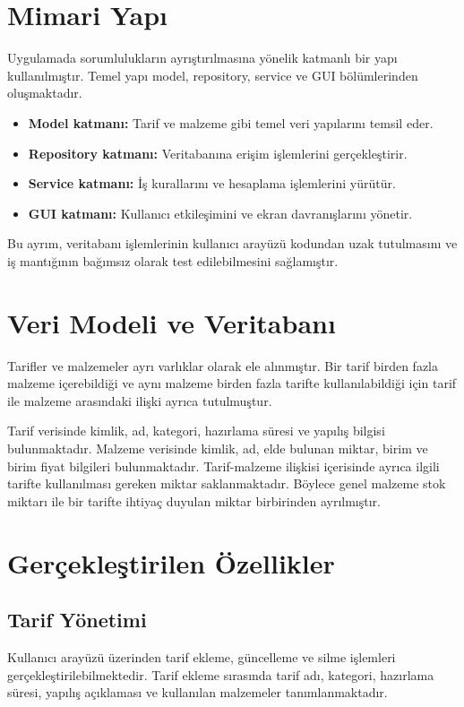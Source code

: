 \documentclass[conference]{IEEEtran}
\begin{document}
\section{Mimari Yapı}
Uygulamada sorumlulukların ayrıştırılmasına yönelik katmanlı bir yapı kullanılmıştır. Temel yapı model, repository, service ve GUI bölümlerinden oluşmaktadır.

\begin{itemize}
    \item \textbf{Model katmanı:} Tarif ve malzeme gibi temel veri yapılarını temsil eder.
    \item \textbf{Repository katmanı:} Veritabanına erişim işlemlerini gerçekleştirir.
    \item \textbf{Service katmanı:} İş kurallarını ve hesaplama işlemlerini yürütür.
    \item \textbf{GUI katmanı:} Kullanıcı etkileşimini ve ekran davranışlarını yönetir.
\end{itemize}

Bu ayrım, veritabanı işlemlerinin kullanıcı arayüzü kodundan uzak tutulmasını ve iş mantığının bağımsız olarak test edilebilmesini sağlamıştır.

\section{Veri Modeli ve Veritabanı}
Tarifler ve malzemeler ayrı varlıklar olarak ele alınmıştır. Bir tarif birden fazla malzeme içerebildiği ve aynı malzeme birden fazla tarifte kullanılabildiği için tarif ile malzeme arasındaki ilişki ayrıca tutulmuştur.

Tarif verisinde kimlik, ad, kategori, hazırlama süresi ve yapılış bilgisi bulunmaktadır. Malzeme verisinde kimlik, ad, elde bulunan miktar, birim ve birim fiyat bilgileri bulunmaktadır. Tarif-malzeme ilişkisi içerisinde ayrıca ilgili tarifte kullanılması gereken miktar saklanmaktadır. Böylece genel malzeme stok miktarı ile bir tarifte ihtiyaç duyulan miktar birbirinden ayrılmıştır.

\section{Gerçekleştirilen Özellikler}
\subsection{Tarif Yönetimi}
Kullanıcı arayüzü üzerinden tarif ekleme, güncelleme ve silme işlemleri gerçekleştirilebilmektedir. Tarif ekleme sırasında tarif adı, kategori, hazırlama süresi, yapılış açıklaması ve kullanılan malzemeler tanımlanmaktadır.
\end{document}
